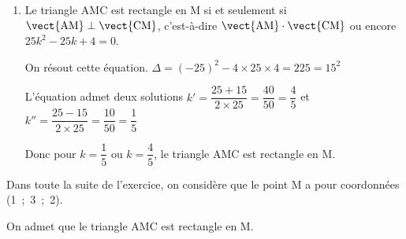 \begin{enumerate}
\begin{enumerate}
$\vect{\text{AM}} \cdot \vect{\text{CM}}
= 5k \times (5k-5) + 3 \times 0 + 2\times 2
 = 25k^2  - 25k + 4$
	
		\item %
Le triangle AMC est rectangle en M si et seulement si $\vect{\text{AM}} \perp \vect{\text{CM}}$, c'est-à-dire $\vect{\text{AM}} \cdot \vect{\text{CM}}$ ou encore $25k^2-25k+4=0$.		
		
On résout cette équation.
$\Delta = (-25)^2-4\times 25\times 4 = 225 = 15^{2}$

L'équation admet deux solutions 
$k'=\dfrac{25+15}{2\times 25} = \dfrac{40}{50}=\dfrac{4}{5}$
et
$k''=\dfrac{25-15}{2\times 25} = \dfrac{10}{50}=\dfrac{1}{5}$

Donc pour $k=\dfrac{1}{5}$ ou $k=\dfrac{4}{5}$, le triangle AMC est rectangle en M.
		
	\end{enumerate}
\end{enumerate}	

Dans toute la suite de l'exercice, on considère que le point M a pour coordonnées (1~;~3~;~2).

On admet que le triangle AMC est rectangle en M.


